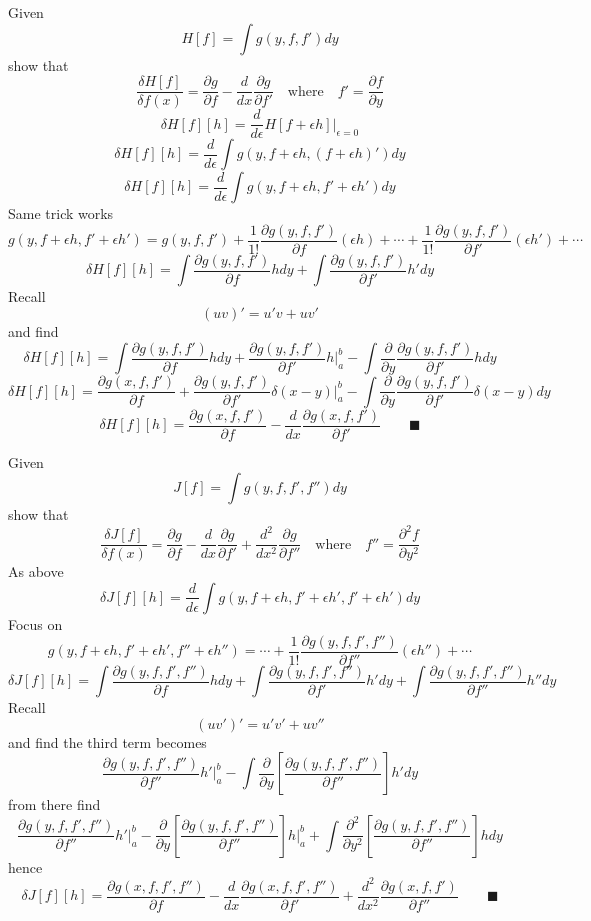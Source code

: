 \documentclass{amsart}
\begin{document}
Given \[H[f]=\int g(y,f,f')dy\]
show that \[\frac{\delta H[f]}{\delta f(x)}=\frac{\partial g}{\partial f} -\frac{d}{dx}\frac{\partial g}{\partial f'} \quad\text{where}\quad f'=\frac{\partial f}{\partial y}\]
\[\delta H[f][h]=\frac{d}{d\epsilon}H[f+\epsilon h]\Big\vert_{\epsilon=0}\]
\[\delta H[f][h]=\frac{d}{d\epsilon}\int g(y,f+\epsilon h,(f+\epsilon h)')dy\]
\[\delta H[f][h]=\frac{d}{d\epsilon}\int g\left(y,f+\epsilon h,f'+\epsilon h'\right)dy\]
Same trick works \[g(y,f+\epsilon h,f'+\epsilon h')=g(y,f,f')+\frac{1}{1!}\frac{\partial g(y,f,f')}{\partial f}(\epsilon h) + \cdots +\frac{1}{1!}\frac{\partial g(y,f,f')}{\partial f'}(\epsilon h') + \cdots \]
\[\delta H[f][h]=\int\frac{\partial g(y,f,f')}{\partial f}hdy+\int\frac{\partial g(y,f,f')}{\partial f' }h'dy\] Recall \[(uv)'=u'v+uv'\] and find
\[\delta H[f][h]=\int\frac{\partial g(y,f,f')}{\partial f}hdy+\frac{\partial g(y,f,f')}{\partial f'}h\Big \vert_a^b-\int\frac{\partial}{\partial y}\frac{\partial g(y,f,f')}{\partial f'}hdy\]
\[\delta H[f][h]=\frac{\partial g(x,f,f')}{\partial f}+\frac{\partial g(y,f,f')}{\partial f'}\delta(x-y)\Big \vert_a^b-\int\frac{\partial}{\partial y}\frac{\partial g(y,f,f')}{\partial f'}\delta(x-y)dy\]
\[\delta H[f][h]=\frac{\partial g(x,f,f')}{\partial f}-\frac{d}{dx}\frac{\partial g(x,f,f')}{\partial f'} \qquad \blacksquare\]

Given \[J[f]=\int g(y,f,f',f'')dy\]
show that \[\frac{\delta J[f]}{\delta f(x)}=\frac{\partial g}{\partial f} -\frac{d}{dx}\frac{\partial g}{\partial f'}+\frac{d^2}{dx^2}\frac{\partial g}{\partial f''} \quad\text{where}\quad f''=\frac{\partial^2 f}{\partial y^2}\]
As above \[\delta J[f][h]=\frac{d}{d\epsilon}\int g\left(y,f+\epsilon h,f'+\epsilon h',f'+\epsilon h'\right)dy\]
Focus on \[g(y,f+\epsilon h,f'+\epsilon h',f''+\epsilon h'')= \cdots +\frac{1}{1!}\frac{\partial g(y,f,f',f'')}{\partial f''}(\epsilon h'') + \cdots \]
\[\delta J[f][h]=\int\frac{\partial g(y,f,f',f'')}{\partial f}hdy+\int\frac{\partial g(y,f,f',f'')}{\partial f'}h'dy+\int\frac{\partial g(y,f,f',f'')}{\partial f''}h''dy\] Recall \[(uv')'=u'v'+uv''\] and find the third term becomes
\[\frac{\partial g(y,f,f',f'')}{\partial f''}h'\Big \vert_a^b-\int\frac{\partial}{\partial y}\left[\frac{\partial g(y,f,f',f'')}{\partial f''}\right]h'dy\]
from there find
\[\frac{\partial g(y,f,f',f'')}{\partial f''}h'\Big \vert_a^b-\frac{\partial}{\partial y}\left[\frac{\partial g(y,f,f',f'')}{\partial f''}\right]h\Big \vert_a^b+\int\frac{\partial^2}{\partial y^2}\left[\frac{\partial g(y,f,f',f'')}{\partial f''}\right]hdy\]
hence
\[\delta J[f][h]=\frac{\partial g(x,f,f',f'')}{\partial f}-\frac{d}{dx}\frac{\partial g(x,f,f',f'')}{\partial f'}+\frac{d^2}{dx^2}\frac{\partial g(x,f,f')}{\partial f''} \qquad \blacksquare\]
\end{document}
